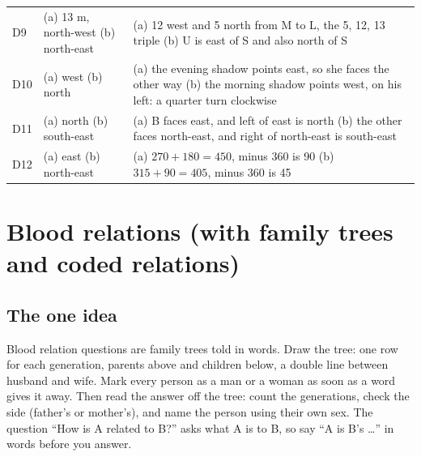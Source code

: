 \documentclass[11pt,a4paper]{article}
\let\oldsubsection\subsection
\renewcommand{\subsection}{\needspace{9\baselineskip}\oldsubsection}
\begin{document}
\begin{center}
\begin{tabularx}{\linewidth}{@{}l>{\raggedright\arraybackslash}X>{\raggedright\arraybackslash}X@{}}
D9 & (a) 13 m, north-west \newline (b) north-east & (a) 12 west and 5 north from M to L, the 5, 12, 13 triple \newline (b) U is east of S and also north of S \\
D10 & (a) west \newline (b) north & (a) the evening shadow points east, so she faces the other way \newline (b) the morning shadow points west, on his left: a quarter turn clockwise \\
D11 & (a) north \newline (b) south-east & (a) B faces east, and left of east is north \newline (b) the other faces north-east, and right of north-east is south-east \\
D12 & (a) east \newline (b) north-east & (a) $270 + 180 = 450$, minus 360 is 90 \newline (b) $315 + 90 = 405$, minus 360 is 45 \\
\bottomrule
\end{tabularx}\end{center}

\clearpage
\section[Blood relations (B1--B12)]{Blood relations (with family trees and coded relations)}\label{ch:B}

\subsection*{The one idea}
Blood relation questions are family trees told in words. Draw the tree: one row for each generation, parents above and children below, a double line between husband and wife. Mark every person as a man or a woman as soon as a word gives it away. Then read the answer off the tree: count the generations, check the side (father's or mother's), and name the person using their own sex. The question ``How is A related to B?'' asks what A is to B, so say ``A is B's \dots'' in words before you answer.
\end{document}
